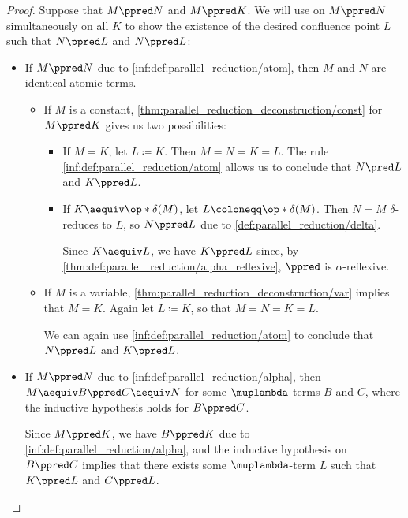 \begin{proof}
   Suppose that \( M \ppred N \) and \( M \ppred K \). We will use  on \( M \ppred N \) simultaneously on all \( K \) to show the existence of the desired confluence point \( L \) such that \( N \ppred L \) and \( N \ppred L \):
  \begin{itemize}
    \item If \( M \ppred N \) due to \ref{inf:def:parallel_reduction/atom}, then \( M \) and \( N \) are identical atomic terms.

    \begin{itemize}
      \item If \( M \) is a constant, \cref{thm:parallel_reduction_deconstruction/const} for \( M \ppred K \) gives us two possibilities:
      \begin{itemize}
        \item If \( M = K \), let \( L \coloneqq K \). Then \( M = N = K = L \). The rule \ref{inf:def:parallel_reduction/atom} allows us to conclude that \( N \pred L \) and \( K \ppred L \).

        \item If \( K \aequiv \op*{\delta}(M) \), let \( L \coloneqq \op*{\delta}(M) \). Then \( N = M \) \( \delta \)-reduces to \( L \), so \( N \ppred L \) due to \ref{def:parallel_reduction/delta}.

       Since \( K \aequiv L \), we have \( K \ppred L \) since, by \cref{thm:def:parallel_reduction/alpha_reflexive}, \( {\ppred} \) is \( \alpha \)-reflexive.
      \end{itemize}

      \item If \( M \) is a variable, \cref{thm:parallel_reduction_deconstruction/var} implies that \( M = K \). Again let \( L \coloneqq K \), so that \( M = N = K = L \).

      We can again use \ref{inf:def:parallel_reduction/atom} to conclude that \( N \ppred L \) and \( K \ppred L \).
    \end{itemize}

    \item If \( M \ppred N \) due to \ref{inf:def:parallel_reduction/alpha}, then \( M \aequiv B \ppred C \aequiv N \) for some \( \muplambda \)-terms \( B \) and \( C \), where the inductive hypothesis holds for \( B \ppred C \).

    Since \( M \ppred K \), we have \( B \ppred K \) due to \ref{inf:def:parallel_reduction/alpha}, and the inductive hypothesis on \( B \ppred C \) implies that there exists some \( \muplambda \)-term \( L \) such that \( K \ppred L \) and \( C \ppred L \).


\end{itemize}
\end{proof}
